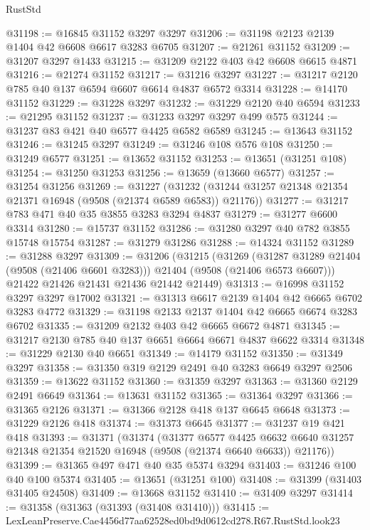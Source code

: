 \begin{lexlean}{RustStd}
\begin{coremodule}
@31198 := @16845 @31152 @3297 @3297
@31206 := @31198 @2123 @2139 @1404 @42 @6608 @6617 @3283 @6705
@31207 := @21261 @31152
@31209 := @31207 @3297 @1433
@31215 := @31209 @2122 @403 @42 @6608 @6615 @4871
@31216 := @21274 @31152
@31217 := @31216 @3297
@31227 := @31217 @2120 @785 @40 @137 @6594 @6607 @6614 @4837 @6572 @3314
@31228 := @14170 @31152
@31229 := @31228 @3297
@31232 := @31229 @2120 @40 @6594
@31233 := @21295 @31152
@31237 := @31233 @3297 @3297 @499 @575
@31244 := @31237 @83 @421 @40 @6577 @4425 @6582 @6589
@31245 := @13643 @31152
@31246 := @31245 @3297
@31249 := @31246 @108 @576 @108
@31250 := @31249 @6577
@31251 := @13652 @31152
@31253 := @13651 (@31251 @108)
@31254 := @31250 @31253
@31256 := @13659 (@13660 @6577)
@31257 := @31254 @31256
@31269 := @31227
    (@31232 (@31244 @31257 @21348 @21354 @21371 @16948 (@9508 (@21374 @6589 @6583)) @21176))
@31277 := @31217 @783 @471 @40 @35 @3855 @3283 @3294 @4837
@31279 := @31277 @6600 @3314
@31280 := @15737 @31152
@31286 := @31280 @3297 @40 @782 @3855 @15748 @15754
@31287 := @31279 @31286
@31288 := @14324 @31152
@31289 := @31288 @3297
@31309 := @31206
    (@31215
      (@31269
        (@31287 @31289 @21404 (@9508 (@21406 @6601 @3283)))
        @21404
        (@9508 (@21406 @6573 @6607)))
      @21422
      @21426
      @21431
      @21436
      @21442
      @21449)
@31313 := @16998 @31152 @3297 @3297 @17002
@31321 := @31313 @6617 @2139 @1404 @42 @6665 @6702 @3283 @4772
@31329 := @31198 @2133 @2137 @1404 @42 @6665 @6674 @3283 @6702
@31335 := @31209 @2132 @403 @42 @6665 @6672 @4871
@31345 := @31217 @2130 @785 @40 @137 @6651 @6664 @6671 @4837 @6622 @3314
@31348 := @31229 @2130 @40 @6651
@31349 := @14179 @31152
@31350 := @31349 @3297
@31358 := @31350 @319 @2129 @2491 @40 @3283 @6649 @3297 @2506
@31359 := @13622 @31152
@31360 := @31359 @3297
@31363 := @31360 @2129 @2491 @6649
@31364 := @13631 @31152
@31365 := @31364 @3297
@31366 := @31365 @2126
@31371 := @31366 @2128 @418 @137 @6645 @6648
@31373 := @31229 @2126 @418
@31374 := @31373 @6645
@31377 := @31237 @19 @421 @418
@31393 := @31371
    (@31374
      (@31377
        @6577
        @4425
        @6632
        @6640
        @31257
        @21348
        @21354
        @21520
        @16948
        (@9508 (@21374 @6640 @6633))
        @21176))
@31399 := @31365 @497 @471 @40 @35 @5374 @3294
@31403 := @31246 @100 @40 @100 @5374
@31405 := @13651 (@31251 @100)
@31408 := @31399 (@31403 @31405 @24508)
@31409 := @13668 @31152
@31410 := @31409 @3297
@31414 := @31358 (@31363 (@31393 (@31408 @31410)))
@31415 := LexLeanPreserve.Cae4456d77aa62528ed0bd9d0612cd278.R67.RustStd.look23

\end{coremodule}
\end{lexlean}
